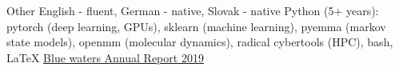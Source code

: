
\begin{rubric}{Other}
\noentry{}
\entry*[Languages] 
 English - fluent, German - native, Slovak - native
	Python (5+ years): pytorch (deep learning, GPUs), sklearn (machine learning), pyemma (markov state models), openmm (molecular dynamics), radical cybertools (HPC), bash, \LaTeX
{}
   \href{https://bluewaters.ncsa.illinois.edu/liferay-content/document-library/BW-Annual-Report-2019/jha_proteins.pdf}{Blue waters Annual Report 2019\small{\faLink}}
\end{rubric}


